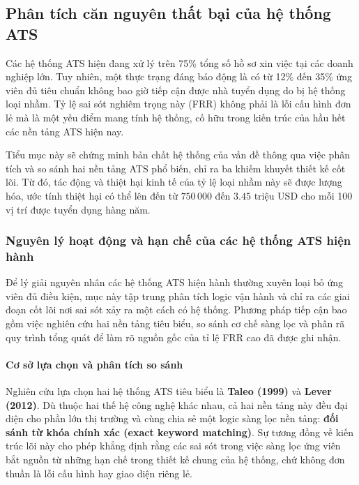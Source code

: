 \documentclass{article}
\begin{document}
\vspace{14pt}
\setcounter{subsection}{0}
\setcounter{table}{0}
\setcounter{figure}{0}
\subsection{Phân tích căn nguyên thất bại của hệ thống ATS}
Các hệ thống ATS hiện đang xử lý trên 75\% tổng số hồ sơ xin việc tại các doanh nghiệp lớn. Tuy nhiên, một thực trạng đáng báo động là có từ 12\% đến 35\% ứng viên đủ tiêu chuẩn không bao giờ tiếp cận được nhà tuyển dụng do bị hệ thống loại nhầm. Tỷ lệ sai sót nghiêm trọng này (FRR) không phải là lỗi cấu hình đơn lẻ mà là một yếu điểm mang tính hệ thống, cố hữu trong kiến trúc của hầu hết các nền tảng ATS hiện nay.

Tiểu mục này sẽ chứng minh bản chất hệ thống của vấn đề thông qua việc phân tích và so sánh hai nền tảng ATS phổ biến, chỉ ra ba khiếm khuyết thiết kế cốt lõi. Từ đó, tác động và thiệt hại kinh tế của tỷ lệ loại nhầm này sẽ được lượng hóa, ước tính thiệt hại có thể lên đến từ $750\,000$ đến $3.45$ triệu USD cho mỗi 100 vị trí được tuyển dụng hàng năm.

\subsubsection{Nguyên lý hoạt động và hạn chế của các hệ thống ATS hiện hành}
Để lý giải nguyên nhân các hệ thống ATS hiện hành thường xuyên loại bỏ ứng viên đủ điều kiện, mục này tập trung phân tích logic vận hành và chỉ ra các giai đoạn cốt lõi nơi sai sót xảy ra một cách có hệ thống. Phương pháp tiếp cận bao gồm việc nghiên cứu hai nền tảng tiêu biểu, so sánh cơ chế sàng lọc và phân rã quy trình tổng quát để làm rõ nguồn gốc của tỉ lệ FRR cao đã được ghi nhận.

\paragraph{Cơ sở lựa chọn và phân tích so sánh}
Nghiên cứu lựa chọn hai hệ thống ATS tiêu biểu là \textbf{Taleo (1999)} và \textbf{Lever (2012)}. Dù thuộc hai thế hệ công nghệ khác nhau, cả hai nền tảng này đều đại diện cho phần lớn thị trường và cùng chia sẻ một logic sàng lọc nền tảng: \textbf{đối sánh từ khóa chính xác (exact keyword matching)}. Sự tương đồng về kiến trúc lõi này cho phép khẳng định rằng các sai sót trong việc sàng lọc ứng viên bắt nguồn từ những hạn chế trong thiết kế chung của hệ thống, chứ không đơn thuần là lỗi cấu hình hay giao diện riêng lẻ.
\end{document}
